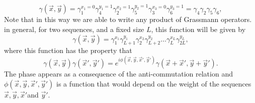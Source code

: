 \begin{equation}
\gamma(\vec{x},\vec{y}) = \gamma_1^{x_1=0} \gamma_{4}^{y_1=1} \gamma_{2}^{x_2=1} \gamma_{5}^{y_2=1} \gamma_{3}^{x_3=0} \gamma_{6}^{y_3=1} = \gamma_{4}\gamma_{2}\gamma_{5}\gamma_{6},
\end{equation}
Note that in this way we are able to write any product of Grassmann operators. in general, for two sequences, and a fixed size $L$, this function will be given by
\begin{equation}
\gamma(\vec{x},\vec{y}) = \gamma_1^{x_1} \gamma_{L+1}^{y_1} \gamma_{2}^{x_2} \gamma_{L+2}^{y_2}\ldots \gamma_{L}^{x_L} \gamma_{2L}^{y_L},
\end{equation} 
where this function has the property that
\begin{equation}
\gamma(\vec{x},\vec{y})\gamma(\vec{x}',\vec{y}') = e^{i\phi(\vec{x},\vec{y},\vec{x}',\vec{y}')} \gamma(\vec{x}+\vec{x}',\vec{y}+\vec{y}').
\label{CH2:my_relation_delta}
\end{equation}
The phase appears as a consequence of the anti-commutation relation and $\phi(\vec{x},\vec{y},\vec{x}',\vec{y}')$ is a function that would depend on the weight of the sequences $\vec{x},\vec{y},\vec{x}'$and $\vec{y}'$.\\

